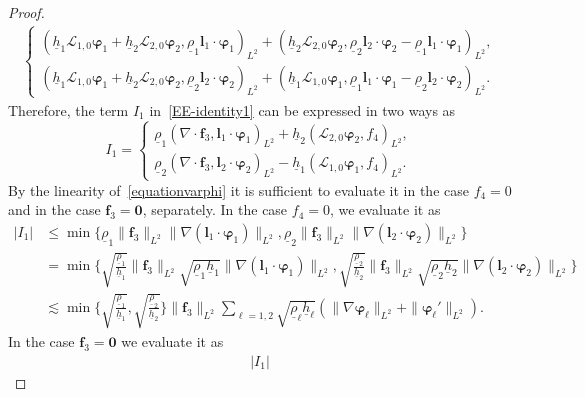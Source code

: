 \documentclass[11pt,leqno]{article}
\numberwithin{equation}{section}
\numberwithin{figure}{section}
\begin{document}
\begin{proof}
\begin{align*}
\begin{cases}
 (\underline{h}_1\mathcal{L}_{1,0}\bm{\varphi}_1+\underline{h}_2\mathcal{L}_{2,0}\bm{\varphi}_2,
  \underline{\rho}_1\bm{l}_1\cdot\bm{\varphi}_1)_{L^2}
 + (\underline{h}_2\mathcal{L}_{2,0}\bm{\varphi}_2,
  \underline{\rho}_2\bm{l}_2\cdot\bm{\varphi}_2-\underline{\rho}_1\bm{l}_1\cdot\bm{\varphi}_1)_{L^2}, \\
 (\underline{h}_1\mathcal{L}_{1,0}\bm{\varphi}_1+\underline{h}_2\mathcal{L}_{2,0}\bm{\varphi}_2,
  \underline{\rho}_2\bm{l}_2\cdot\bm{\varphi}_2)_{L^2}
 + (\underline{h}_1\mathcal{L}_{1,0}\bm{\varphi}_1,
  \underline{\rho}_1\bm{l}_1\cdot\bm{\varphi}_1-\underline{\rho}_2\bm{l}_2\cdot\bm{\varphi}_2)_{L^2}.
\end{cases}
\end{align*}
%
Therefore, the term $I_1$ in~\eqref{EE-identity1} can be expressed in two ways as 
%
\[
I_1 = 
\begin{cases}
 \underline{\rho}_1(\nabla\cdot\bm{f}_3,\bm{l}_1\cdot\bm{\varphi}_1)_{L^2}
  + \underline{h}_2(\mathcal{L}_{2,0}\bm{\varphi}_2,f_4)_{L^2}, \\
 \underline{\rho}_2(\nabla\cdot\bm{f}_3,\bm{l}_2\cdot\bm{\varphi}_2)_{L^2}
  - \underline{h}_1(\mathcal{L}_{1,0}\bm{\varphi}_1,f_4)_{L^2}.
\end{cases}
\]
%
By the linearity of~\eqref{equationvarphi} it is sufficient to evaluate it in the case 
$f_4=0$ and in the case $\bm{f}_3=\bm{0}$, separately. 
In the case $f_4=0$, we evaluate it as 
%
\begin{align*}
|I_1|
&\leq \min\{ \underline{\rho}_1\|\bm{f}_3\|_{L^2}\|\nabla(\bm{l}_1\cdot\bm{\varphi}_1)\|_{L^2},
  \underline{\rho}_2\|\bm{f}_3\|_{L^2}\|\nabla(\bm{l}_2\cdot\bm{\varphi}_2)\|_{L^2} \} \\
&= \min\biggl\{ \sqrt{\frac{\underline{\rho}_1}{\underline{h}_1}}\|\bm{f}_3\|_{L^2}
  \sqrt{\underline{\rho}_1\underline{h}_1}\|\nabla(\bm{l}_1\cdot\bm{\varphi}_1)\|_{L^2}, 
 \sqrt{\frac{\underline{\rho}_2}{\underline{h}_2}}\|\bm{f}_3\|_{L^2}
  \sqrt{\underline{\rho}_2\underline{h}_2}\|\nabla(\bm{l}_2\cdot\bm{\varphi}_2)\|_{L^2} \biggr\} \\
&\lesssim \min\biggl\{ \sqrt{\frac{\underline{\rho}_1}{\underline{h}_1}},
  \sqrt{\frac{\underline{\rho}_2}{\underline{h}_2}} \biggr\} \|\bm{f}_3\|_{L^2}
 \sum_{\ell=1,2}\sqrt{\underline{\rho}_\ell\underline{h}_\ell}
 ( \|\nabla\bm{\varphi}_\ell\|_{L^2} + \|\bm{\varphi}_\ell'\|_{L^2} ).
\end{align*}
%
In the case $\bm{f}_3=\bm{0}$ we evaluate it as 
%
\begin{align*}
|I_1|

\end{align*}
\end{proof}
\end{document}
